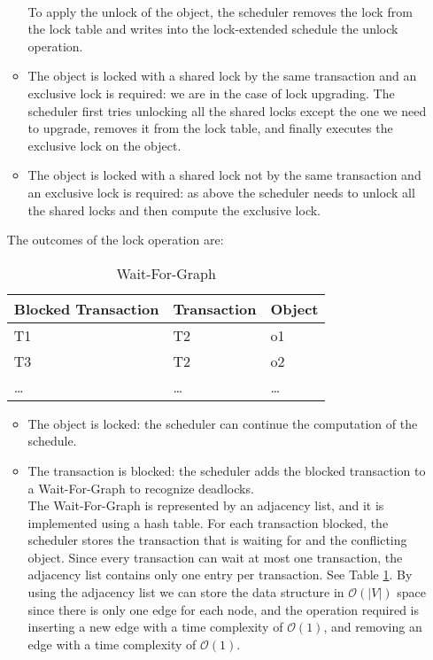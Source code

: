 \documentclass{article}
\begin{document}
\begin{itemize}
\begin{itemize}
        \\
        To apply the unlock of the object, the scheduler removes the lock from the lock table and writes into the lock-extended schedule the unlock operation.
        \item The object is locked with a shared lock by the same transaction and an exclusive lock is required: we are in the case of lock upgrading. The scheduler first tries unlocking all the shared locks except the one we need to upgrade, removes it from the lock table, and finally executes the exclusive lock on the object.  
        \item The object is locked with a shared lock not by the same transaction and an exclusive lock is required: as above the scheduler needs to unlock all the shared locks and then compute the exclusive lock.
    \end{itemize}
    The outcomes of the lock operation are:
    \begin{table}[]
        \caption{Wait-For-Graph}
        \begin{tabular}{l||l|l}
            Blocked Transaction & Transaction   & Object    \\
            \hline
            \hline
            T1                  & T2            & o1        \\
            \hline
            T3                  & T2            & o2        \\
            \hline
            \dots & \dots    & \dots     \\    
        \end{tabular}
        \label{table:wait_for_graph}
    \end{table}
    \begin{itemize}
        \item The object is locked: the scheduler can continue the computation of the schedule.
        \item The transaction is blocked: the scheduler adds the blocked transaction to a Wait-For-Graph to recognize deadlocks.
        \\
        The Wait-For-Graph is represented by an adjacency list, and it is implemented using a hash table. For each transaction blocked, the scheduler stores the transaction that is waiting for and the conflicting object. Since every transaction can wait at most one transaction, the adjacency list contains only one entry per transaction. See Table \ref{table:wait_for_graph}.
        By using the adjacency list we can store the data structure in $\mathcal{O}(|V|)$ space since there is only one edge for each node, and the operation required is inserting a new edge with a time complexity of $\mathcal{O}(1)$, and removing an edge with a time complexity of $\mathcal{O}(1)$.

\end{itemize}
\end{itemize}
\end{document}
